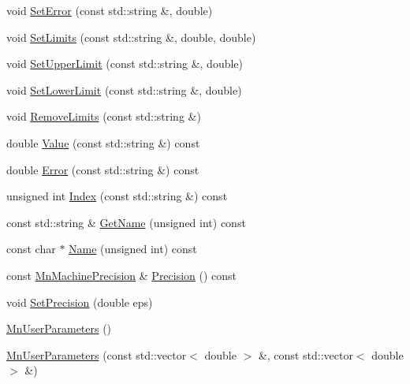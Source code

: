 \begin{DoxyCompactItemize}
\item 
void \mbox{\hyperlink{classROOT_1_1Minuit2_1_1MnUserParameters_aa3d8a9df23458438ccff06800d7c9af2}{Set\+Error}} (const std\+::string \&, double)
\item 
void \mbox{\hyperlink{classROOT_1_1Minuit2_1_1MnUserParameters_a3b22d430f97df8789a8890497c57eed4}{Set\+Limits}} (const std\+::string \&, double, double)
\item 
void \mbox{\hyperlink{classROOT_1_1Minuit2_1_1MnUserParameters_afc550532eeecdcb361f4c707032067e7}{Set\+Upper\+Limit}} (const std\+::string \&, double)
\item 
void \mbox{\hyperlink{classROOT_1_1Minuit2_1_1MnUserParameters_a3423d925b9a4b455c6130fa19f66adb4}{Set\+Lower\+Limit}} (const std\+::string \&, double)
\item 
void \mbox{\hyperlink{classROOT_1_1Minuit2_1_1MnUserParameters_a4aff83aa7fb5e9c0a7edf70f360f68fa}{Remove\+Limits}} (const std\+::string \&)
\item 
double \mbox{\hyperlink{classROOT_1_1Minuit2_1_1MnUserParameters_a4d08de604380552a826ac23ca4978767}{Value}} (const std\+::string \&) const
\item 
double \mbox{\hyperlink{classROOT_1_1Minuit2_1_1MnUserParameters_a52dd385b551b309d26d0dc30581c0b56}{Error}} (const std\+::string \&) const
\item 
unsigned int \mbox{\hyperlink{classROOT_1_1Minuit2_1_1MnUserParameters_a30523af61ec1c817b0eb060d560f9a95}{Index}} (const std\+::string \&) const
\item 
const std\+::string \& \mbox{\hyperlink{classROOT_1_1Minuit2_1_1MnUserParameters_a83594fef03edc5f0948e05a290e67fc2}{Get\+Name}} (unsigned int) const
\item 
const char $\ast$ \mbox{\hyperlink{classROOT_1_1Minuit2_1_1MnUserParameters_a1228bfaf2fd8b6f27ac5c302644e5120}{Name}} (unsigned int) const
\item 
const \mbox{\hyperlink{classROOT_1_1Minuit2_1_1MnMachinePrecision}{Mn\+Machine\+Precision}} \& \mbox{\hyperlink{classROOT_1_1Minuit2_1_1MnUserParameters_a52f62fcd0d9d9f6e907b07cc0194f547}{Precision}} () const
\item 
void \mbox{\hyperlink{classROOT_1_1Minuit2_1_1MnUserParameters_aceaa10ac8b2c83261c3cc026705ee6e0}{Set\+Precision}} (double eps)
\item 
\mbox{\hyperlink{classROOT_1_1Minuit2_1_1MnUserParameters_afc09ce197c2e03a228cc9cafc3855371}{Mn\+User\+Parameters}} ()
\item 
\mbox{\hyperlink{classROOT_1_1Minuit2_1_1MnUserParameters_a465242ec980354f799665ee8d2452d58}{Mn\+User\+Parameters}} (const std\+::vector$<$ double $>$ \&, const std\+::vector$<$ double $>$ \&)

\end{DoxyCompactItemize}
